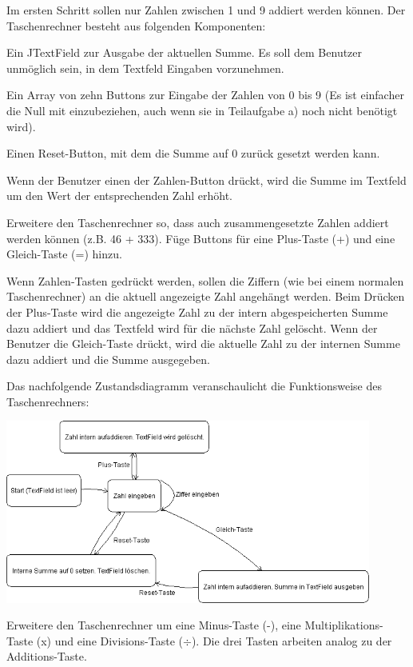 \begin{compactenum}[a)]
\item Im ersten Schritt sollen nur Zahlen zwischen 1 und 9 addiert werden
können. Der Taschenrechner besteht aus folgenden Komponenten:

\begin{compactitem}
\item Ein JTextField zur Ausgabe der aktuellen Summe. Es soll dem Benutzer
unmöglich sein, in dem Textfeld Eingaben vorzunehmen.
\item Ein Array von zehn Buttons zur Eingabe der Zahlen von 0 bis 9 (Es ist
einfacher die Null mit einzubeziehen, auch wenn sie in Teilaufgabe a) noch
nicht benötigt wird).
\item Einen Reset-Button, mit dem die Summe auf 0 zurück gesetzt werden kann. 
\end{compactitem}

Wenn der Benutzer einen der Zahlen-Button drückt, wird die Summe im Textfeld um
den Wert der entsprechenden Zahl erhöht.

\item Erweitere den Taschenrechner so, dass auch zusammengesetzte Zahlen
addiert werden können (z.B. 46 + 333). Füge Buttons für eine Plus-Taste (+) und
eine Gleich-Taste (=) hinzu.

Wenn Zahlen-Tasten gedrückt werden, sollen die Ziffern (wie bei einem normalen
Taschenrechner) an die aktuell angezeigte Zahl angehängt werden. Beim Drücken
der Plus-Taste wird die angezeigte Zahl zu der intern abgespeicherten Summe
dazu addiert und das Textfeld wird für die nächste Zahl gelöscht. Wenn der
Benutzer die Gleich-Taste drückt, wird die aktuelle Zahl zu der internen Summe
dazu addiert und die Summe ausgegeben.

Das nachfolgende Zustandsdiagramm veranschaulicht die Funktionsweise des
Taschenrechners:

\begin{center}
\includegraphics[width=0.9\textwidth]{./inf/SEKII/24_Java_GUI-Komponenten/Taschenrechner-Zustandsdiagramm.png}
\end{center}

\item Erweitere den Taschenrechner um eine Minus-Taste (-), eine
Multiplikations-Taste (x) und eine Divisions-Taste ($\div$). Die drei Tasten
arbeiten analog zu der Additions-Taste.
\end{compactenum}
